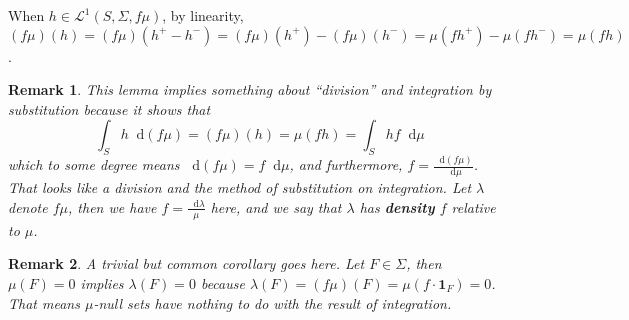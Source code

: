 \documentclass[12pt]{article}
\newcommand*{\dif}{\mathop{}\!\mathrm{d}}
\newcommand{\ind}[1]{\mathbf{1}_{#1}}
\newtheorem{remark}{Remark}
\begin{document}
	When $h\in \mathcal{L}^1(S,\Sigma,f\mu)$, by linearity,  $(f\mu)(h)=(f\mu)(h^+-h^-)=(f\mu)(h^+)-(f\mu)(h^-)=\mu(fh^+)-\mu(fh^-)=\mu(fh)$.
	
	\begin{remark}
		This lemma implies something about ``division'' and integration by substitution because it shows that
		$$\int_S h \dif{(f\mu)}=(f\mu)(h)=\mu(fh)=\int_Shf\dif\mu$$
		which to some degree means $\dif{(f\mu)}=f\dif\mu$, and furthermore, $f=\frac{\dif{(f\mu)}}{\dif\mu}$. That looks like a division and the method of substitution on integration.
		Let $\lambda$ denote $f\mu$, then we have $f=\frac{\dif{\lambda}}{\mu}$ here, and we say that $\lambda$ has \textbf{density} $f$ relative to $\mu$.
	\end{remark}

	\begin{remark}
		A trivial but common corollary goes here. Let $F\in\Sigma$, then $\mu(F)=0$ implies $\lambda(F)=0$ because $\lambda(F)=(f\mu)(F)=\mu(f\cdot \ind{F})=0$. That means $\mu$-null sets have nothing to do with the result of integration.
	\end{remark}

	
\end{document}

